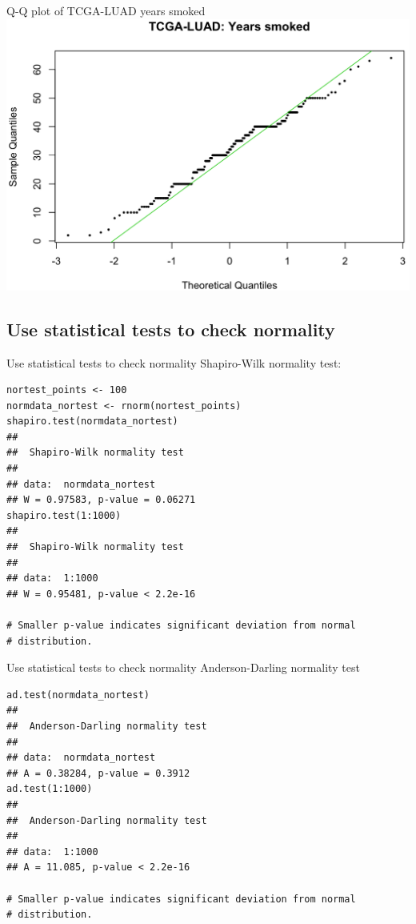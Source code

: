 \documentclass[12pt, t, xcolor=dvipsnames]{beamer}
\begin{document}
\begin{frame}{Q-Q plot of TCGA-LUAD years smoked}
\includegraphics[width=\textwidth, keepaspectratio]{qqys}
\end{frame}

\subsection{Use statistical tests to check normality}

\begin{frame}[fragile]{Use statistical tests to check normality}
Shapiro-Wilk normality test:
\begin{verbatim}
nortest_points <- 100
normdata_nortest <- rnorm(nortest_points)
shapiro.test(normdata_nortest)
## 
##  Shapiro-Wilk normality test
## 
## data:  normdata_nortest
## W = 0.97583, p-value = 0.06271
shapiro.test(1:1000)
## 
##  Shapiro-Wilk normality test
## 
## data:  1:1000
## W = 0.95481, p-value < 2.2e-16

# Smaller p-value indicates significant deviation from normal 
# distribution. 
\end{verbatim}


\end{frame}

\begin{frame}[fragile]{Use statistical tests to check normality}
Anderson-Darling normality test

\begin{verbatim}
ad.test(normdata_nortest)
## 
##  Anderson-Darling normality test
## 
## data:  normdata_nortest
## A = 0.38284, p-value = 0.3912
ad.test(1:1000)
## 
##  Anderson-Darling normality test
## 
## data:  1:1000
## A = 11.085, p-value < 2.2e-16

# Smaller p-value indicates significant deviation from normal 
# distribution. 
\end{verbatim}

\end{frame}
\end{document}
